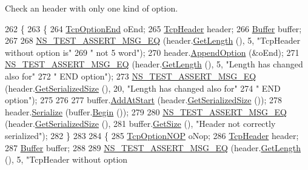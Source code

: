 Check an header with only one kind of option. 


\begin{DoxyCode}
262 \{
263   \{
264     \hyperlink{classns3_1_1TcpOptionEnd}{TcpOptionEnd} oEnd;
265     \hyperlink{classns3_1_1TcpHeader}{TcpHeader} header;
266     \hyperlink{classns3_1_1Buffer}{Buffer} buffer;
267 
268     \hyperlink{group__testing_ga2a9d78cffb3db8e867c35fff0b698cf5}{NS\_TEST\_ASSERT\_MSG\_EQ} (header.\hyperlink{classns3_1_1TcpHeader_a957928d2dd1108dc1ef8c38daecdcf62}{GetLength} (), 5, \textcolor{stringliteral}{"TcpHeader without option
       is"}
269                            \textcolor{stringliteral}{" not 5 word"});
270     header.\hyperlink{classns3_1_1TcpHeader_aa5de13df3dd5cb87d63c428e5dcc3425}{AppendOption} (&oEnd);
271     \hyperlink{group__testing_ga2a9d78cffb3db8e867c35fff0b698cf5}{NS\_TEST\_ASSERT\_MSG\_EQ} (header.\hyperlink{classns3_1_1TcpHeader_a957928d2dd1108dc1ef8c38daecdcf62}{GetLength} (), 5, \textcolor{stringliteral}{"Length has changed also
       for"}
272                            \textcolor{stringliteral}{" END option"});
273     \hyperlink{group__testing_ga2a9d78cffb3db8e867c35fff0b698cf5}{NS\_TEST\_ASSERT\_MSG\_EQ} (header.\hyperlink{classns3_1_1TcpHeader_a1cbb8a10b7838d428f2e94806d3ce807}{GetSerializedSize} (), 20, \textcolor{stringliteral}{"Length
       has changed also for"}
274                            \textcolor{stringliteral}{" END option"});
275 
276 
277     buffer.\hyperlink{classns3_1_1Buffer_a8abd8164c3671d3dadc98fc66fade7b1}{AddAtStart} (header.\hyperlink{classns3_1_1TcpHeader_a1cbb8a10b7838d428f2e94806d3ce807}{GetSerializedSize} ());
278     header.\hyperlink{classns3_1_1TcpHeader_ab492a55e7e9a54ec4938035696877aa3}{Serialize} (buffer.\hyperlink{classns3_1_1Buffer_a893d4bf50df13e730b6cd0fda91b967f}{Begin} ());
279 
280     \hyperlink{group__testing_ga2a9d78cffb3db8e867c35fff0b698cf5}{NS\_TEST\_ASSERT\_MSG\_EQ} (header.\hyperlink{classns3_1_1TcpHeader_a1cbb8a10b7838d428f2e94806d3ce807}{GetSerializedSize} (),
281                            buffer.\hyperlink{classns3_1_1Buffer_a3047b8f2dad303c6370695122f1884f0}{GetSize} (), \textcolor{stringliteral}{"Header not correctly serialized"});
282   \}
283 
284   \{
285     \hyperlink{classns3_1_1TcpOptionNOP}{TcpOptionNOP} oNop;
286     \hyperlink{classns3_1_1TcpHeader}{TcpHeader} header;
287     \hyperlink{classns3_1_1Buffer}{Buffer} buffer;
288 
289     \hyperlink{group__testing_ga2a9d78cffb3db8e867c35fff0b698cf5}{NS\_TEST\_ASSERT\_MSG\_EQ} (header.\hyperlink{classns3_1_1TcpHeader_a957928d2dd1108dc1ef8c38daecdcf62}{GetLength} (), 5, \textcolor{stringliteral}{"TcpHeader without option
}
\end{DoxyCode}

